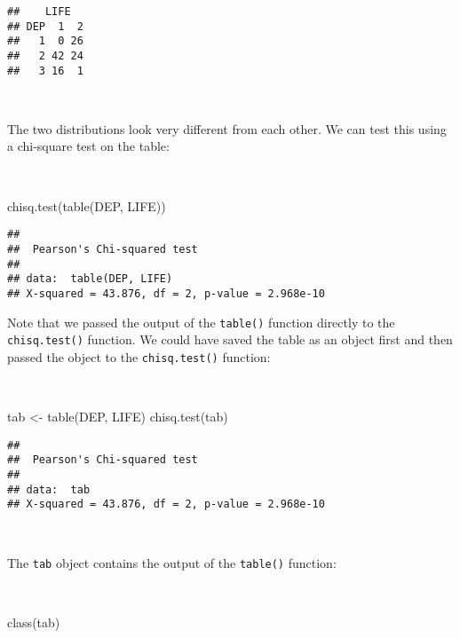\documentclass[
  12pt,
  a4paper]{book}
\newenvironment{Shaded}{\begin{snugshade}}{\end{snugshade}}
\newcommand{\FunctionTok}[1]{\textcolor[rgb]{0.00,0.00,0.00}{#1}}
\newcommand{\NormalTok}[1]{#1}
\newcommand{\OtherTok}[1]{\textcolor[rgb]{0.56,0.35,0.01}{#1}}
\begin{document}
\begin{verbatim}
##    LIFE
## DEP  1  2
##   1  0 26
##   2 42 24
##   3 16  1
\end{verbatim}

~

The two distributions look very different from each other. We can test this using a chi-square test on the table:

~

\begin{Shaded}
\begin{Highlighting}[]
\FunctionTok{chisq.test}\NormalTok{(}\FunctionTok{table}\NormalTok{(DEP, LIFE))}
\end{Highlighting}
\end{Shaded}

\begin{verbatim}
## 
##  Pearson's Chi-squared test
## 
## data:  table(DEP, LIFE)
## X-squared = 43.876, df = 2, p-value = 2.968e-10
\end{verbatim}

\newpage

Note that we passed the output of the \texttt{table()} function directly to the \texttt{chisq.test()} function. We could have saved the table as an object first and then passed the object to the \texttt{chisq.test()} function:

~

\begin{Shaded}
\begin{Highlighting}[]
\NormalTok{tab }\OtherTok{\textless{}{-}} \FunctionTok{table}\NormalTok{(DEP, LIFE)}
\FunctionTok{chisq.test}\NormalTok{(tab)}
\end{Highlighting}
\end{Shaded}

\begin{verbatim}
## 
##  Pearson's Chi-squared test
## 
## data:  tab
## X-squared = 43.876, df = 2, p-value = 2.968e-10
\end{verbatim}

~

The \texttt{tab} object contains the output of the \texttt{table()} function:

~

\begin{Shaded}
\begin{Highlighting}[]
\FunctionTok{class}\NormalTok{(tab)}
\end{Highlighting}
\end{Shaded}
\end{document}
